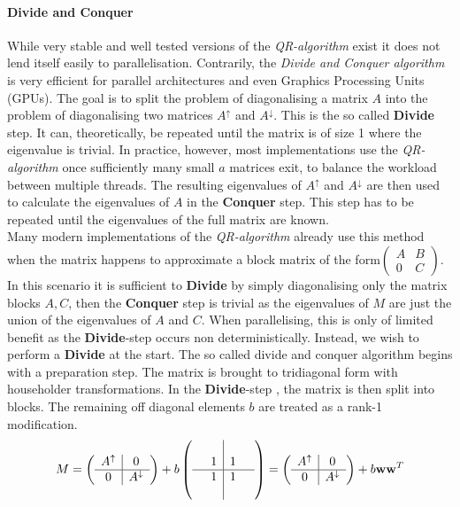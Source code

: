 \documentclass[Master]{subfiles}
\begin{document}
\paragraph {Divide and Conquer}
While very stable and well tested versions of the \textit{QR-algorithm} exist it does not lend itself easily to parallelisation. Contrarily, the \textit{Divide and Conquer algorithm} \cite{cuppen1980divide} is very efficient for parallel architectures and even Graphics Processing Units (GPUs). The goal is to split the problem of diagonalising a matrix $A$ into the problem of diagonalising two matrices $A^{\uparrow}$ and $A^{\downarrow}$. This is the so called \textbf{Divide} step. It can, theoretically, be repeated until the matrix is of size 1 where the eigenvalue is trivial. In practice, however, most implementations use the \textit{QR-algorithm} once sufficiently many small $a$ matrices exit, to balance the workload between multiple threads. 
The resulting eigenvalues of  $A^{\uparrow}$ and $A^{\downarrow}$ are then used to calculate the eigenvalues of $A$ in the \textbf{Conquer} step. This step has to be repeated until the eigenvalues of the full matrix are known. \\
Many modern implementations of the \textit{QR-algorithm} already use this method when the matrix happens to approximate a block matrix of the form$\left( \begin{array}{c|c}
     A & B \\
     \hline
     0 & C
\end{array}\right)$. In this scenario it is sufficient to \textbf{Divide} by simply diagonalising only the matrix blocks $A,C$, then the \textbf{Conquer} step is trivial as the eigenvalues of $M$ are just the union of the eigenvalues of $A$ and $C$. When parallelising, this is only of limited benefit as the \textbf{Divide}-step occurs non deterministically. Instead, we wish to perform a \textbf{Divide} at the start. The so called divide and conquer algorithm begins with a preparation step.
The matrix is brought to tridiagonal form with householder transformations. 
In the \textbf{Divide}-step \cite{cuppen1980divide}, the matrix is then split into blocks. The remaining off diagonal elements $b$ are treated as a rank-1 modification.
$$ M = 
\left(\begin{array}{c|c}
    A^{\uparrow} & 0 \\
    \hline
   0  & A^{\downarrow}
\end{array}\right)
+ b\left( \begin{array}{cc|cc}
     &&& \\
      &  1&1&\\
     \hline
     &1&1&  \\
     & &&
\end{array}\right) = \left(\begin{array}{c|c}
    A^{\uparrow} & 0 \\
    \hline
   0  & A^{\downarrow}
\end{array}\right) + b  \vec{w}\vec{w}^T
$$
\end{document}
